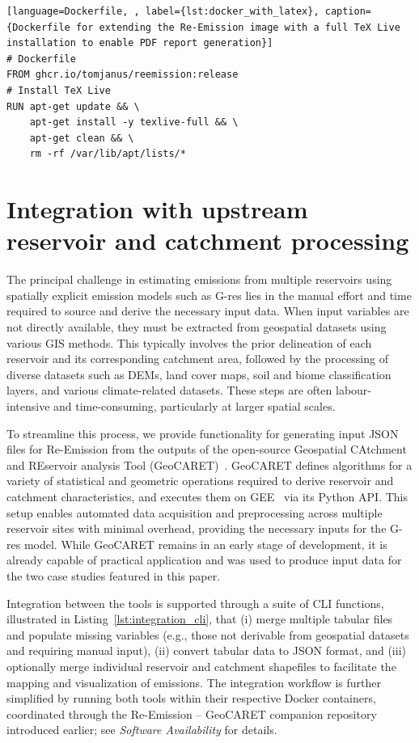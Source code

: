 \documentclass[final,1p,times]{elsarticle}
\begin{document}
\begin{minipage}{0.95\textwidth}
\begin{lstlisting}[language=Dockerfile, , label={lst:docker_with_latex}, caption={Dockerfile for extending the Re-Emission image with a full TeX Live installation to enable PDF report generation}]
# Dockerfile
FROM ghcr.io/tomjanus/reemission:release
# Install TeX Live
RUN apt-get update && \
    apt-get install -y texlive-full && \
    apt-get clean && \
    rm -rf /var/lib/apt/lists/*
\end{lstlisting}
\end{minipage}

\section{Integration with upstream reservoir and catchment processing}
\label{sec:integration}

The principal challenge in estimating emissions from multiple reservoirs using spatially explicit emission models such as G-res lies in the manual effort and time required to source and derive the necessary input data. 
When input variables are not directly available, they must be extracted from geospatial datasets using various \ac{GIS} methods. 
This typically involves the prior delineation of each reservoir and its corresponding catchment area, followed by the processing of diverse datasets such as \acp{DEM}, land cover maps, soil and biome classification layers, and various climate-related datasets. 
These steps are often labour-intensive and time-consuming, particularly at larger spatial scales.

To streamline this process, we provide functionality for generating input JSON files for Re-Emission from the outputs of the open-source Geospatial CAtchment and REservoir analysis Tool (GeoCARET)~\cite{heettool}.
GeoCARET defines algorithms for a variety of statistical and geometric operations required to derive reservoir and catchment characteristics, and executes them on \ac{GEE}~\cite{gorelick2017google} via its Python API. 
This setup enables automated data acquisition and preprocessing across multiple reservoir sites with minimal overhead, providing the necessary inputs for the G-res model.
While GeoCARET remains in an early stage of development, it is already capable of practical application and was used to produce input data for the two case studies featured in this paper.

Integration between the tools is supported through a suite of \ac{CLI} functions, illustrated in Listing~\ref{lst:integration_cli}, that (i) merge multiple tabular files and populate missing variables (e.g., those not derivable from geospatial datasets and requiring manual input), (ii) convert tabular data to JSON format, and (iii) optionally merge individual reservoir and catchment shapefiles to facilitate the mapping and visualization of emissions. 
The integration workflow is further simplified by running both tools within their respective Docker containers, coordinated through the Re-Emission -- GeoCARET companion repository~\cite{janus_geocaret_reemission} introduced earlier; see \emph{Software Availability} for details.
\end{document}
